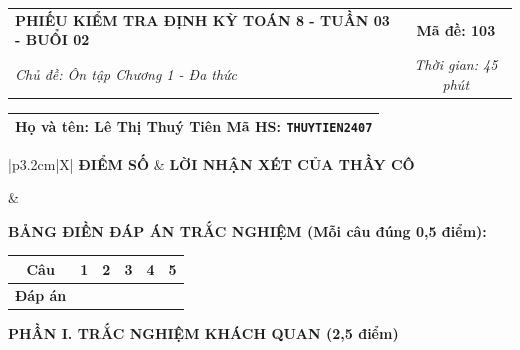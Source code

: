 \documentclass[12pt,a4paper]{article}
\begin{document}
\newpage


\noindent
\begin{tabularx}{\linewidth}{|X|c|}
\hline
\textbf{PHIẾU KIỂM TRA ĐỊNH KỲ TOÁN 8 - TUẦN 03 - BUỔI 02} & \textbf{Mã đề: 103} \\
\textit{Chủ đề: Ôn tập Chương 1 - Đa thức} & \textit{Thời gian: 45 phút} \\
\hline
\end{tabularx}

\vspace{1mm}

\noindent
\begin{tabularx}{\linewidth}{|X|}
\hline
\rule[-2mm]{0pt}{7.5mm}\textbf{Họ và tên:} \textbf{\large Lê Thị Thuý Tiên} \hfill \textbf{Mã HS:} \texttt{THUYTIEN2407} \quad \\
\hline
\end{tabularx}

\vspace{1mm}

\noindent
\begin{tabularx}{\linewidth}{|p{3.2cm}|X|}
\hline
\centering\textbf{ĐIỂM SỐ} & \centering\textbf{LỜI NHẬN XÉT CỦA THẦY CÔ} \tabularnewline
\hline
\rule{0pt}{1.3cm} & \tabularnewline
\hline
\end{tabularx}

\vspace{1.2mm}

\noindent\textbf{BẢNG ĐIỀN ĐÁP ÁN TRẮC NGHIỆM (Mỗi câu đúng 0,5 điểm):}
\vspace{0.8mm}

\noindent
\renewcommand{\arraystretch}{1.35}
\begin{tabularx}{\linewidth}{|c|*{5}{>{\centering\arraybackslash}X|}}
\hline
\textbf{Câu} & \textbf{1} & \textbf{2} & \textbf{3} & \textbf{4} & \textbf{5} \\
\hline
\textbf{Đáp án} & & & & & \\
\hline
\end{tabularx}
\renewcommand{\arraystretch}{1.0}

\vspace{1.5mm}

\noindent\textbf{\large PHẦN I. TRẮC NGHIỆM KHÁCH QUAN (2,5 điểm)}
\vspace{1mm}
\end{document}
